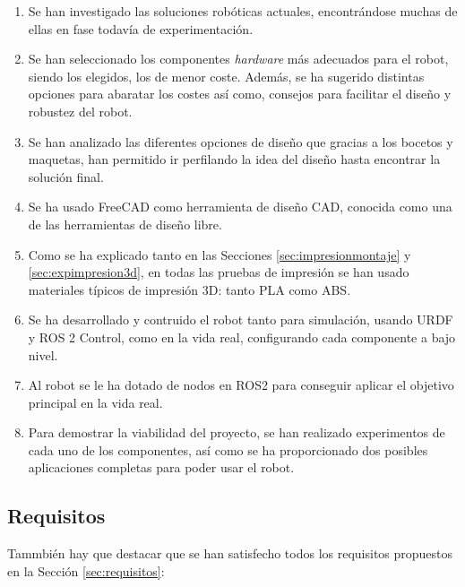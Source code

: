 \begin{enumerate}
	\item Se han investigado las soluciones robóticas actuales, encontrándose muchas de ellas en fase todavía de experimentación.
	\item Se han seleccionado los componentes \textit{hardware} más adecuados para el robot, siendo  los elegidos, los de menor coste. Además, se ha sugerido distintas opciones para abaratar los costes así como, consejos para facilitar el diseño y robustez del robot. 
	\item Se han analizado las diferentes opciones de diseño que gracias a los bocetos y maquetas, han permitido ir perfilando la idea del diseño hasta encontrar la solución final.
	\item Se ha usado FreeCAD como herramienta de diseño \acs{CAD}, conocida como una de las herramientas de diseño libre. 
	\item Como se ha explicado tanto en las Secciones \ref{sec:impresionmontaje} y \ref{sec:expimpresion3d}, en todas las pruebas de impresión se han usado materiales típicos de impresión 3D: tanto PLA como ABS.
	\item Se ha desarrollado  y contruido el robot tanto para simulación, usando URDF y ROS 2 Control, como en la vida real, configurando cada componente a bajo nivel.
	\item Al robot se le ha dotado de nodos en ROS2 para conseguir aplicar el objetivo principal en la vida real.
	\item Para demostrar la viabilidad del proyecto, se han realizado experimentos de cada uno de los componentes, así como se ha proporcionado dos posibles aplicaciones completas para poder usar el robot.  
\end{enumerate}

\subsection{Requisitos}

Tammbién hay que destacar que se han satisfecho todos los requisitos propuestos en la Sección \ref{sec:requisitos}:


